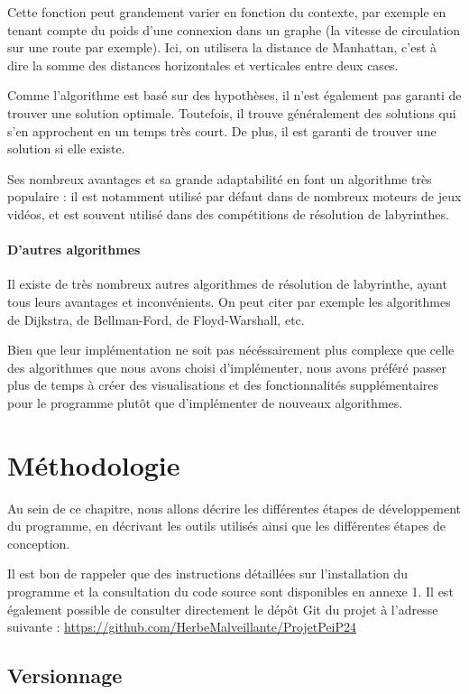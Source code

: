 \documentclass[12pt]{scrreprt} %
\begin{document}
Cette fonction peut grandement varier en fonction du contexte, par exemple en tenant compte du poids d'une connexion dans un graphe (la vitesse de circulation sur une route par exemple). Ici, on utilisera la distance de Manhattan, c'est à dire la somme des distances horizontales et verticales entre deux cases.

Comme l'algorithme est basé sur des hypothèses, il n'est également pas garanti de trouver une solution optimale. Toutefois, il trouve généralement des solutions qui s'en approchent en un temps très court. De plus, il est garanti de trouver une solution si elle existe.

Ses nombreux avantages et sa grande adaptabilité en font un algorithme très populaire : il est notamment utilisé par défaut dans de nombreux moteurs de jeux vidéos, et est souvent utilisé dans des compétitions de résolution de labyrinthes.

\subsubsection{D'autres algorithmes}

Il existe de très nombreux autres algorithmes de résolution de labyrinthe, ayant tous leurs avantages et inconvénients. On peut citer par exemple les algorithmes de Dijkstra, de Bellman-Ford, de Floyd-Warshall, etc.

Bien que leur implémentation ne soit pas nécéssairement plus complexe que celle des algorithmes que nous avons choisi d'implémenter, nous avons préféré passer plus de temps à créer des visualisations et des fonctionnalités supplémentaires pour le programme plutôt que d'implémenter de nouveaux algorithmes.

\chapter{Méthodologie}


Au sein de ce chapitre, nous allons décrire les différentes étapes de développement du programme, en décrivant les outils utilisés ainsi que les différentes étapes de conception.

Il est bon de rappeler que des instructions détaillées sur l'installation du programme et la consultation du code source sont disponibles en annexe 1. Il est également possible de consulter directement le dépôt Git du projet à l'adresse suivante : \url{https://github.com/HerbeMalveillante/ProjetPeiP24}

\section{Versionnage}
\end{document}
